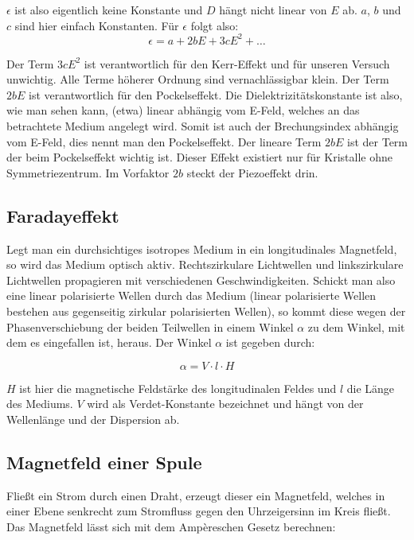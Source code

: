 $\epsilon$ ist also eigentlich keine Konstante und $D$ hängt nicht linear von $E$ ab. $a$, $b$ und $c$ sind hier einfach Konstanten. Für $\epsilon$ folgt also:
\begin{equation} \epsilon = a + 2bE + 3cE^2 + \dots \end{equation}

Der Term $3cE^2$ ist verantwortlich für den Kerr-Effekt und für unseren Versuch unwichtig. Alle Terme höherer Ordnung sind vernachlässigbar klein. Der Term $2bE$ ist verantwortlich für den Pockelseffekt. Die Dielektrizitätskonstante ist also, wie man sehen kann, (etwa) linear abhängig vom E-Feld, welches an das betrachtete Medium angelegt wird. Somit ist auch der Brechungsindex abhängig vom E-Feld, dies nennt man den Pockelseffekt. Der lineare Term $2bE$ ist der Term der beim Pockelseffekt wichtig ist. Dieser Effekt existiert nur für Kristalle ohne Symmetriezentrum. Im Vorfaktor $2b$ steckt der Piezoeffekt drin. 


\subsection{Faradayeffekt}

Legt man ein durchsichtiges isotropes Medium in ein longitudinales Magnetfeld, so wird das Medium optisch aktiv. Rechtszirkulare Lichtwellen und linkszirkulare Lichtwellen propagieren mit verschiedenen Geschwindigkeiten. Schickt man also eine linear polarisierte Wellen durch das Medium (linear polarisierte Wellen bestehen aus gegenseitig zirkular polarisierten Wellen), so kommt diese wegen der Phasenverschiebung der beiden Teilwellen in einem Winkel $\alpha$ zu dem Winkel, mit dem es eingefallen ist, heraus. Der Winkel $\alpha$ ist gegeben durch:

\begin{equation} \alpha = V\cdot l \cdot H \end{equation}

$H$ ist hier die magnetische Feldstärke des longitudinalen Feldes und $l$ die Länge des Mediums. $V$ wird als Verdet-Konstante bezeichnet und hängt von der Wellenlänge und der Dispersion ab.

\subsection{Magnetfeld einer Spule}

Fließt ein Strom durch einen Draht, erzeugt dieser ein Magnetfeld, welches in einer Ebene senkrecht zum Stromfluss gegen den Uhrzeigersinn im Kreis fließt. Das Magnetfeld lässt sich mit dem Ampèreschen Gesetz berechnen:

